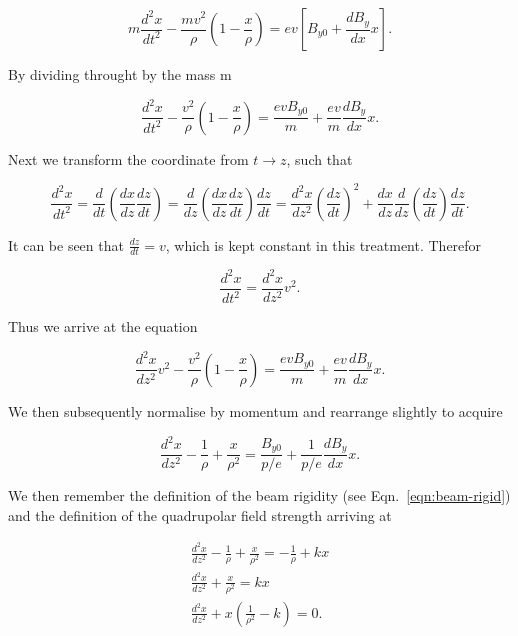 \begin{equation}
 m\frac{d^{2}x}{dt^{2}}  - \frac{mv^{2}}{\rho}\left( 1 - \frac{x}{\rho} \right) = e v \left[ B_{y0} + \frac{dB_{y}}{dx} x \right].
\end{equation}

By dividing throught by the mass m

\begin{equation}
 \frac{d^{2}x}{dt^{2}}  - \frac{v^{2}}{\rho}\left( 1 - \frac{x}{\rho} \right) = \frac{e v B_{y0}}{m} + \frac{ev}{m}\frac{dB_{y}}{dx} x.
\end{equation}

Next we transform the coordinate from $t \rightarrow z$, such that 

\begin{equation}
\frac{d^{2}x}{dt^{2}} = \frac{d}{dt} \left( \frac{dx}{dz} \frac{dz}{dt} \right) = \frac{d}{dz} \left( \frac{dx}{dz} \frac{dz}{dt} \right) \frac{dz}{dt} = \frac{d^{2}x}{dz^{2}}\left( \frac{dz}{dt} \right)^{2} + \frac{dx}{dz} \frac{d}{dz} \left( \frac{dz}{dt} \right) \frac{dz}{dt}.
\end{equation}

It can be seen that $\frac{dz}{dt} = v$, which is kept constant in this treatment. Therefor

\begin{equation}
\frac{d^{2}x}{dt^{2}} = \frac{d^{2}x}{dz^{2}} v^{2}.
\end{equation}

Thus we arrive at the equation

\begin{equation}
\frac{d^{2}x}{dz^{2}} v^{2} - \frac{v^{2}}{\rho}\left( 1 - \frac{x}{\rho} \right) = \frac{e v B_{y0}}{m} + \frac{ev}{m}\frac{dB_{y}}{dx} x.
\end{equation}

We then subsequently normalise by momentum and rearrange slightly to acquire

\begin{equation}
\frac{d^{2}x}{dz^{2}} - \frac{1}{\rho} + \frac{x}{\rho^{2}}  = \frac{ B_{y0}}{p/e} + \frac{1}{p/e}\frac{dB_{y}}{dx} x.
\end{equation}

We then remember the definition of the beam rigidity (see Eqn.~\ref{eqn:beam-rigid}) and the definition of the quadrupolar field strength arriving at

\begin{align}
\frac{d^{2}x}{dz^{2}} - \frac{1}{\rho} + \frac{x}{\rho^{2}}  = - \frac{1}{\rho} + k x \\ \nonumber
\frac{d^{2}x}{dz^{2}} + \frac{x}{\rho^{2}}  = k x \\ \nonumber
\frac{d^{2}x}{dz^{2}} + x \left( \frac{1}{\rho^{2}} - k\right)  = 0.
\label{eqn:horz-eqn-motion}
\end{align}

